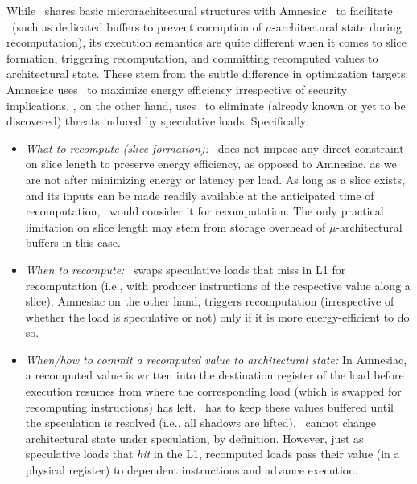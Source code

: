 While \arch\ shares basic microrachitectural structures with Amnesiac~\cite{amnesiac17} to facilitate \recomp\ (such as dedicated buffers to prevent corruption of $\mu$-architectural state during recomputation), its
execution semantics are quite different when it comes to slice formation, triggering recomputation, and committing recomputed values to architectural state. These stem from the subtle difference in optimization targets: Amnesiac uses \recomp\ to maximize energy efficiency irrespective of security implications. \arch, on the other hand, uses \recomp\ to eliminate (already known or yet to be discovered) threats induced by speculative loads. Specifically: 
 \begin{itemize}
     \item{\em What to recompute (slice formation):} \arch\ does not impose any direct constraint on slice length to preserve energy efficiency, as opposed to Amnesiac, as we are not after minimizing energy or latency per load. As long as a slice exists, and its inputs can be made readily available at the anticipated time of recomputation, \arch\ would consider it for recomputation. The only practical limitation on slice length may stem from storage overhead of $\mu$-architectural buffers in this case. 
     \item {\em When to recompute:} \arch\ swaps speculative loads that miss in L1 for recomputation (i.e., with producer instructions of the respective value along a slice). Amnesiac on the other hand, triggers recomputation (irrespective of whether the load is speculative or not) only if it is more energy-efficient to do so. 
     \item{\em When/how to commit a recomputed value to architectural state:} In Amnesiac, a recomputed value is written into the destination register of the  load before execution resumes from where the corresponding load (which is swapped for recomputing instructions) has left. \arch\ has to keep these values buffered until the speculation is resolved (i.e., all shadows are lifted).  \recomp\ cannot change architectural state under speculation, by definition. {However, just as speculative loads that \emph{hit} in the L1, recomputed loads pass their value (in a physical register) to dependent instructions and advance execution.}  
 \end{itemize}
 
